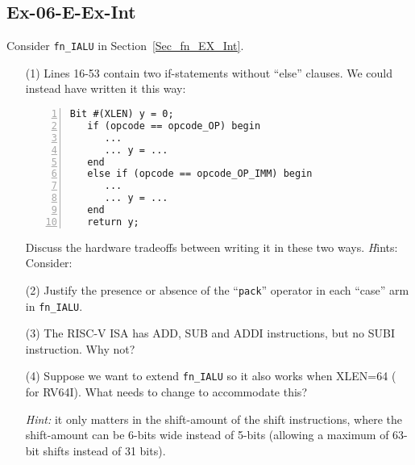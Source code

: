 
\subsection*{Ex-06-E-Ex-Int}

\label{Ex-06-E-Ex-Int}

Consider {\tt fn\_IALU} in Section~\ref{Sec_fn_EX_Int}.

\begin{itemize}

\item[(1)] Lines 16-53 contain two if-statements without ``else''
    clauses.  We could instead have written it this way:

    {\footnotesize
    \begin{Verbatim}[frame=single, numbers=left]
   Bit #(XLEN) y = 0;
   if (opcode == opcode_OP) begin
      ...
      ... y = ...
   end
   else if (opcode == opcode_OP_IMM) begin
      ...
      ... y = ...
   end
   return y;
    \end{Verbatim}
    }

    Discuss the hardware tradeoffs between writing it in these two
    ways.  {\emph Hints:} Consider:


\item[(2)] Justify the presence or absence of the ``{\tt pack}''
    operator in each ``case'' arm in {\tt fn\_IALU}.

\item[(3)] The RISC-V ISA has ADD, SUB and ADDI instructions, but no
    SUBI instruction.  Why not?

\item[(4)] Suppose we want to extend {\tt fn\_IALU} so it also works
    when XLEN=64 ({\ie} for RV64I).  What needs to change to
    accommodate this?

    \emph{Hint:} it only matters in the shift-amount of the shift
    instructions, where the shift-amount can be 6-bits wide instead of
    5-bits (allowing a maximum of 63-bit shifts instead of 31 bits).

\end{itemize}


